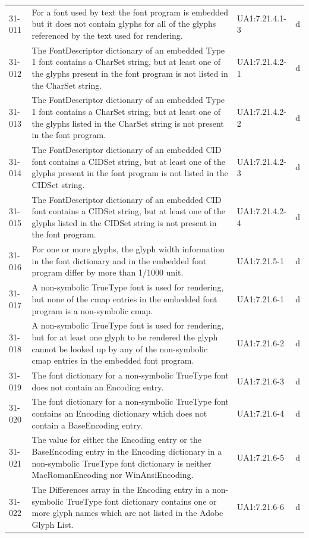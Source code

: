 \documentclass{book}
\begin{document}
\begin{tabular}{lp{5cm}lp{5cm}}
  31-011 & For a font used by text the font program is embedded but it does not contain glyphs for all of the glyphs referenced by the text used for rendering. & UA1:7.21.4.1-3 & d\\
  31-012 & The FontDescriptor dictionary of an embedded Type 1 font contains a CharSet string, but at least one of the glyphs present in the font program is not listed in the CharSet string. & UA1:7.21.4.2-1 & d\\
  31-013 & The FontDescriptor dictionary of an embedded Type 1 font contains a CharSet string, but at least one of the glyphs listed in the CharSet string is not present in the font program. & UA1:7.21.4.2-2 & d\\
  31-014 & The FontDescriptor dictionary of an embedded CID font contains a CIDSet string, but at least one of the glyphs present in the font program is not listed in the CIDSet string. & UA1:7.21.4.2-3 & d\\
  31-015 & The FontDescriptor dictionary of an embedded CID font contains a CIDSet string, but at least one of the glyphs listed in the CIDSet string is not present in the font program. & UA1:7.21.4.2-4 & d\\
  31-016 & For one or more glyphs, the glyph width information in the font dictionary and in the embedded font program differ by more than 1/1000 unit. & UA1:7.21.5-1 & d\\
  31-017 & A non-symbolic TrueType font is used for rendering, but none of the cmap entries in the embedded font program is a non-symbolic cmap. & UA1:7.21.6-1 & d\\
  31-018 & A non-symbolic TrueType font is used for rendering, but for at least one glyph to be rendered the glyph cannot be looked up by any of the non-symbolic cmap entries in the embedded font program. & UA1:7.21.6-2 & d\\
  31-019 & The font dictionary for a non-symbolic TrueType font does not contain an Encoding entry. & UA1:7.21.6-3 & d\\
  31-020 & The font dictionary for a non-symbolic TrueType font contains an Encoding dictionary which does not contain a BaseEncoding entry. & UA1:7.21.6-4 & d\\
  31-021 & The value for either the Encoding entry or the BaseEncoding entry in the Encoding dictionary in a non-symbolic TrueType font dictionary is neither MacRomanEncoding nor WinAnsiEncoding. & UA1:7.21.6-5 & d\\
  31-022 & The Differences array in the Encoding entry in a non-symbolic TrueType font dictionary contains one or more glyph names which are not listed in the Adobe Glyph List. & UA1:7.21.6-6 & d\\

\end{tabular}
\end{document}
